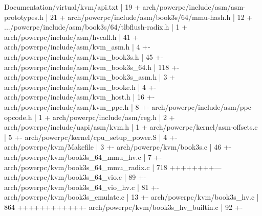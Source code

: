 \documentclass[landscape, 14pt]{report}
\newenvironment{Shaded}{}{}
\newcommand{\DecValTok}[1]{\textcolor[rgb]{0.25,0.63,0.44}{#1}}
\newcommand{\NormalTok}[1]{#1}
\begin{document}
\begin{Shaded}
\begin{Highlighting}[]
\NormalTok{ Documentation/virtual/kvm/api.txt                  |   }\DecValTok{19}\NormalTok{ +}
\NormalTok{ arch/powerpc/include/asm/asm-prototypes.h          |   }\DecValTok{21}\NormalTok{ +}
\NormalTok{ arch/powerpc/include/asm/book3s/}\DecValTok{64}\NormalTok{/mmu-hash.h      |   }\DecValTok{12}\NormalTok{ +}
\NormalTok{ .../powerpc/include/asm/book3s/}\DecValTok{64}\NormalTok{/tlbflush-radix.h |    }\DecValTok{1}\NormalTok{ +}
\NormalTok{ arch/powerpc/include/asm/hvcall.h                  |   }\DecValTok{41}\NormalTok{ +}
\NormalTok{ arch/powerpc/include/asm/kvm_asm.h                 |    }\DecValTok{4}\NormalTok{ +-}
\NormalTok{ arch/powerpc/include/asm/kvm_book3s.h              |   }\DecValTok{45}\NormalTok{ +-}
\NormalTok{ arch/powerpc/include/asm/kvm_book3s_64.h           |  }\DecValTok{118}\NormalTok{ +-}
\NormalTok{ arch/powerpc/include/asm/kvm_book3s_asm.h          |    }\DecValTok{3}\NormalTok{ +}
\NormalTok{ arch/powerpc/include/asm/kvm_booke.h               |    }\DecValTok{4}\NormalTok{ +-}
\NormalTok{ arch/powerpc/include/asm/kvm_host.h                |   }\DecValTok{16}\NormalTok{ +-}
\NormalTok{ arch/powerpc/include/asm/kvm_ppc.h                 |    }\DecValTok{8}\NormalTok{ +-}
\NormalTok{ arch/powerpc/include/asm/ppc-opcode.h              |    }\DecValTok{1}\NormalTok{ +}
\NormalTok{ arch/powerpc/include/asm/reg.h                     |    }\DecValTok{2}\NormalTok{ +}
\NormalTok{ arch/powerpc/include/uapi/asm/kvm.h                |    }\DecValTok{1}\NormalTok{ +}
\NormalTok{ arch/powerpc/kernel/asm-offsets.c                  |    }\DecValTok{5}\NormalTok{ +-}
\NormalTok{ arch/powerpc/kernel/cpu_setup_power.S              |    }\DecValTok{4}\NormalTok{ +-}
\NormalTok{ arch/powerpc/kvm/Makefile                          |    }\DecValTok{3}\NormalTok{ +-}
\NormalTok{ arch/powerpc/kvm/book3s.c                          |   }\DecValTok{46}\NormalTok{ +-}
\NormalTok{ arch/powerpc/kvm/book3s_64_mmu_hv.c                |    }\DecValTok{7}\NormalTok{ +-}
\NormalTok{ arch/powerpc/kvm/book3s_64_mmu_radix.c             |  }\DecValTok{718}\NormalTok{ ++++++++---}
\NormalTok{ arch/powerpc/kvm/book3s_64_vio.c                   |   }\DecValTok{89}\NormalTok{ +-}
\NormalTok{ arch/powerpc/kvm/book3s_64_vio_hv.c                |   }\DecValTok{81}\NormalTok{ +-}
\NormalTok{ arch/powerpc/kvm/book3s_emulate.c                  |   }\DecValTok{13}\NormalTok{ +-}
\NormalTok{ arch/powerpc/kvm/book3s_hv.c                       |  }\DecValTok{864}\NormalTok{ ++++++++++++-}
\NormalTok{ arch/powerpc/kvm/book3s_hv_builtin.c               |   }\DecValTok{92}\NormalTok{ +-}

\end{Highlighting}
\end{Shaded}
\end{document}
